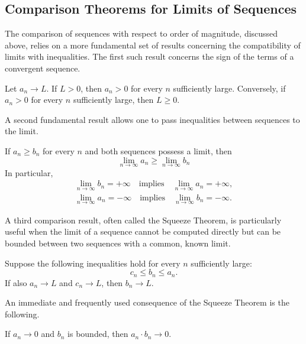 \subsection{Comparison Theorems for Limits of Sequences}

The comparison of sequences with respect to order of magnitude, discussed above, relies on a more fundamental
set of results concerning the compatibility of limits with inequalities. The first such result concerns the sign
of the terms of a convergent sequence.

\begin{theorem}
Let $a_n \to L$. If $L > 0$, then $a_n > 0$ for every $n$ sufficiently large. Conversely, if $a_n > 0$ for every
$n$ sufficiently large, then $L \geq 0$.
\end{theorem}

A second fundamental result allows one to pass inequalities between sequences to the limit.

\begin{theorem}
If $a_n \geq b_n$ for every $n$ and both sequences possess a limit, then
\[
\lim_{n \to \infty} a_n \geq \lim_{n \to \infty} b_n
\]
In particular,
\[
\begin{gathered}
\lim_{n \to \infty} b_n = +\infty\quad\text{implies}\quad \lim_{n \to \infty} a_n = +\infty, \\
\lim_{n \to \infty} a_n = -\infty\quad\text{implies}\quad \lim_{n \to \infty} b_n = -\infty.
\end{gathered}
\]

\end{theorem}

A third comparison result, often called the Squeeze Theorem, is particularly useful when the limit of a sequence
cannot be computed directly but can be bounded between two sequences with a common, known limit.

\begin{theorem}
Suppose the following inequalities hold for every $n$ sufficiently large:
\[
c_n \leq b_n \leq a_n.
\]
If also $a_n \to L$ and $c_n \to L$, then $b_n \to L$.
\end{theorem}

An immediate and frequently used consequence of the Squeeze Theorem is the following.

\begin{corollary}
If $a_n \to 0$ and $b_n$ is bounded, then $a_n \cdot b_n \to 0$.
\end{corollary}

